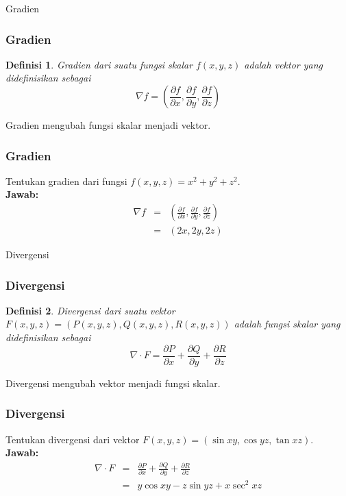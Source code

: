 \documentclass[10pt]{beamer}
\newtheorem{definisi}{Definisi}
\begin{document}
\begin{frame}{Gradien}
    \frametitle{Gradien}
    \begin{definisi}
        Gradien dari suatu fungsi skalar $f(x,y,z)$ adalah vektor yang didefinisikan sebagai
        \begin{equation}
            \nabla f = \left(\frac{\partial f}{\partial x}, \frac{\partial f}{\partial y}, \frac{\partial f}{\partial z}\right)
        \end{equation}
    \end{definisi}
    Gradien mengubah fungsi skalar menjadi vektor.
\end{frame}

\begin{frame}
    \frametitle{Gradien}
    \begin{example}
        Tentukan gradien dari fungsi $f(x,y,z) = x^2 + y^2 + z^2$.\\
        \textbf{Jawab:}
        \begin{eqnarray*}
            \nabla f &=& \left(\frac{\partial f}{\partial x}, \frac{\partial f}{\partial y}, \frac{\partial f}{\partial z}\right)\\
            &=& \left(2x, 2y, 2z\right)
        \end{eqnarray*}
    \end{example}
\end{frame}

\begin{frame}{Divergensi}
    \frametitle{Divergensi}
    \begin{definisi}
        Divergensi dari suatu vektor $F(x,y,z) = (P(x,y,z), Q(x,y,z), R(x,y,z))$ adalah fungsi skalar yang didefinisikan sebagai
        \begin{equation}
            \nabla \cdot F = \frac{\partial P}{\partial x} + \frac{\partial Q}{\partial y} + \frac{\partial R}{\partial z}
        \end{equation}
    \end{definisi}
    Divergensi mengubah vektor menjadi fungsi skalar.
\end{frame}

\begin{frame}
    \frametitle{Divergensi}
    \begin{example}
        Tentukan divergensi dari vektor $F(x,y,z) = (\sin xy, \cos yz, \tan xz)$.\\
        \textbf{Jawab:}
        \begin{eqnarray*}
            \nabla \cdot F &=& \frac{\partial P}{\partial x} + \frac{\partial Q}{\partial y} + \frac{\partial R}{\partial z}\\
            &=& y\cos xy - z \sin yz + x\sec^2 xz
        \end{eqnarray*}
    \end{example}
\end{frame}
\end{document}
